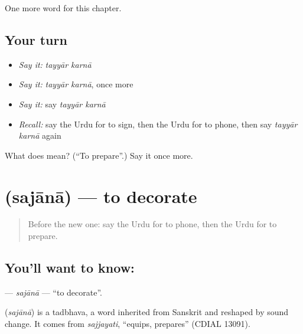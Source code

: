 \begin{grammarlens}[title={What you've built}]
One more word for this chapter.
\end{grammarlens}

\subsection*{Your turn}
\begin{itemize}
\raggedright
  \item \emph{Say it:} \emph{tayyār karnā}
  \item \emph{Say it:} \emph{tayyār karnā}, once more
  \item \emph{Say it:} say \emph{tayyār karnā}
  \item \emph{Recall:} say the Urdu for to sign, then the Urdu for to phone, then say \emph{tayyār karnā} again
\end{itemize}

\begin{tcolorbox}[breakable,colback=teal!4,colframe=teal!35!black,title={Before you move on}]
What does   mean? (\textquotedblleft{}To prepare\textquotedblright{}.) Say it once more.
\end{tcolorbox}
\section[\texorpdfstring{\ur{سجانا} (sajānā)}{سجانا (sajānā)}]{ (sajānā) — to decorate}

\label{lesson:UR-C151-sajana}



\begin{quote}
Before the new one: say the Urdu for to phone, then the Urdu for to prepare.
\end{quote}

\subsection*{You'll want to know: }
\textbf{} — \emph{sajānā} — \textquotedblleft{}to decorate\textquotedblright{}.

\begin{cousinweb}
\textbf{} (\emph{sajānā}) is a tadbhava, a word inherited from Sanskrit and reshaped by sound change. It comes from \emph{sajjayati}, \textquotedblleft{}equips, prepares\textquotedblright{} (CDIAL 13091).
\end{cousinweb}

